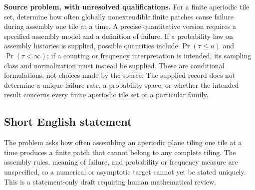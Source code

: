\documentclass[11pt]{article}
\begin{document}
\textbf{Source problem, with unresolved qualifications.} For a finite aperiodic tile set, determine how often globally nonextendible finite patches cause failure during assembly one tile at a time. A precise quantitative version requires a specified assembly model and a definition of failure. If a probability law on assembly histories is supplied, possible quantities include \(\Pr(\tau\le n)\) and \(\Pr(\tau<\infty)\); if a counting or frequency interpretation is intended, its sampling class and normalization must instead be supplied. These are conditional formulations, not choices made by the source. The supplied record does not determine a unique failure rate, a probability space, or whether the intended result concerns every finite aperiodic tile set or a particular family.
\subsection{Short English statement}
The problem asks how often assembling an aperiodic plane tiling one tile at a time produces a finite patch that cannot belong to any complete tiling. The assembly rules, meaning of failure, and probability or frequency measure are unspecified, so a numerical or asymptotic target cannot yet be stated uniquely. This is a statement-only draft requiring human mathematical review.
\end{document}
